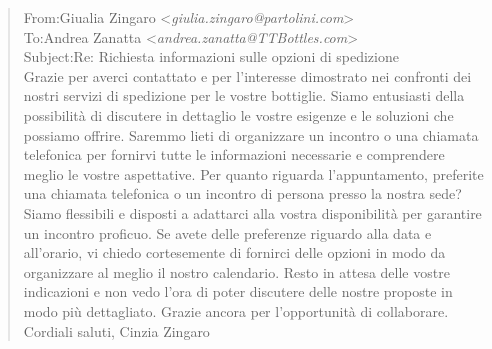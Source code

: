 \begin{tcolorbox}[colback=gray!20, colframe=gray!50,sharp corners=southwest]
\begin{quote}
From:\qquad Giualia Zingaro <\textit{giulia.zingaro@partolini.com}>\\
To:\qquad Andrea Zanatta <\textit{andrea.zanatta@TTBottles.com}>\\
Subject:\qquad Re: Richiesta informazioni sulle opzioni di spedizione\vspace{14pt}\\
Grazie per averci contattato e per l'interesse dimostrato nei confronti dei nostri servizi di spedizione per le vostre bottiglie.
Siamo entusiasti della possibilità di discutere in dettaglio le vostre esigenze e le soluzioni che possiamo offrire. Saremmo lieti di organizzare un incontro o una chiamata telefonica per fornirvi tutte le informazioni necessarie e comprendere meglio le vostre aspettative.
Per quanto riguarda l'appuntamento, preferite una chiamata telefonica o un incontro di persona presso la nostra sede? Siamo flessibili e disposti a adattarci alla vostra disponibilità per garantire un incontro proficuo.
Se avete delle preferenze riguardo alla data e all'orario, vi chiedo cortesemente di fornirci delle opzioni in modo da organizzare al meglio il nostro calendario.
Resto in attesa delle vostre indicazioni e non vedo l'ora di poter discutere delle nostre proposte in modo più dettagliato.
Grazie ancora per l'opportunità di collaborare.
Cordiali saluti,
Cinzia Zingaro
\vspace{14pt}\\


\end{quote}
\end{tcolorbox}

